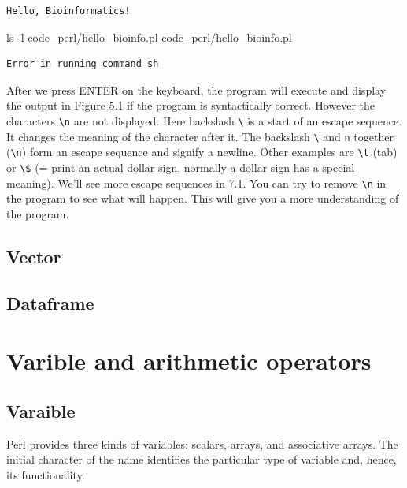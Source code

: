 \documentclass[]{book}
\makeatletter
\newenvironment{Shaded}{\begin{snugshade}}{\end{snugshade}}
\newcommand{\FunctionTok}[1]{\textcolor[rgb]{0.00,0.00,0.00}{#1}}
\newcommand{\ExtensionTok}[1]{#1}
\newcommand{\NormalTok}[1]{#1}
\newenvironment{kframe}{%
\medskip{}
\setlength{\fboxsep}{.8em}
 \def\at@end@of@kframe{}%
 \ifinner\ifhmode%
  \def\at@end@of@kframe{\end{minipage}}%
  \begin{minipage}{\columnwidth}%
 \fi\fi%
 \def\FrameCommand##1{\hskip\@totalleftmargin \hskip-\fboxsep
 \colorbox{shadecolor}{##1}\hskip-\fboxsep
     \hskip-\linewidth \hskip-\@totalleftmargin \hskip\columnwidth}%
 \MakeFramed {\advance\hsize-\width
   \@totalleftmargin\z@ \linewidth\hsize
   \@setminipage}}%
 {\par\unskip\endMakeFramed%
 \at@end@of@kframe}
\renewenvironment{Shaded}{\begin{kframe}}{\end{kframe}}
\theoremstyle{definition}
\theoremstyle{definition}
\theoremstyle{definition}
\theoremstyle{remark}
\makeatother
\begin{document}
\begin{verbatim}
Hello, Bioinformatics!
\end{verbatim}

\begin{Shaded}
\begin{Highlighting}[]
\FunctionTok{ls}\NormalTok{ -l code_perl/hello_bioinfo.pl}
\ExtensionTok{code_perl/hello_bioinfo.pl}
\end{Highlighting}
\end{Shaded}

\begin{verbatim}
Error in running command sh
\end{verbatim}

After we press ENTER on the keyboard, the program will execute and
display the output in Figure 5.1 if the program is syntactically
correct. However the characters \texttt{\textbackslash{}n} are not
displayed. Here backslash \texttt{\textbackslash{}} is a start of an
escape sequence. It changes the meaning of the character after it. The
backslash \texttt{\textbackslash{}} and \texttt{n} together
(\texttt{\textbackslash{}n}) form an escape sequence and signify a
newline. Other examples are \texttt{\textbackslash{}t} (tab) or
\texttt{\textbackslash{}\$} (= print an actual dollar sign, normally a
dollar sign has a special meaning). We'll see more escape sequences in
7.1. You can try to remove \texttt{\textbackslash{}n} in the program to
see what will happen. This will give you a more understanding of the
program.

\section{Vector}\label{vector}

\section{Dataframe}\label{dataframe}

\chapter{Varible and arithmetic
operators}\label{varible-and-arithmetic-operators}

\section{Varaible}\label{varaible}

Perl provides three kinds of variables: scalars, arrays, and associative
arrays. The initial character of the name identifies the particular type
of variable and, hence, its functionality.
\end{document}
